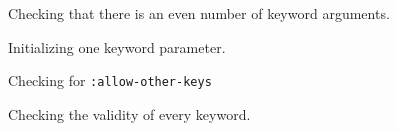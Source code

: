 \begin{figure}
\begin{center}
\end{center}
\caption{\label{fig-check-even-keyword-arguments}
Checking that there is an even number of keyword arguments.}
\end{figure}

\begin{figure}
\begin{center}
\end{center}
\caption{\label{fig-initialize-one-keyword-parameter}
Initializing one keyword parameter.}
\end{figure}

\begin{figure}
\begin{center}
\end{center}
\caption{\label{fig-check-allow-other-keys}
Checking for \texttt{:allow-other-keys}}
\end{figure}

\begin{figure}
\begin{center}
\end{center}
\caption{\label{fig-check-every-keyword}
Checking the validity of every keyword.}
\end{figure}
